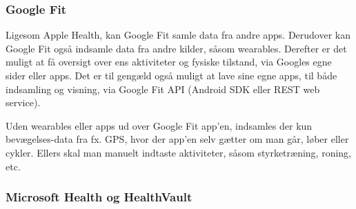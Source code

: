 \subsubsection{Google Fit}
Ligesom Apple Health, kan Google Fit samle data fra andre apps.
Derudover kan Google Fit også indsamle data fra andre kilder, såsom wearables.
Derefter er det muligt at få oversigt over ens aktiviteter og fysiske tilstand, via Googles egne sider eller apps.
Det er til gengæld også muligt at lave sine egne apps, til både indsamling og visning, via Google Fit API (Android SDK eller REST web service).

Uden wearables eller apps ud over Google Fit app'en, indsamles der kun bevægelses-data fra fx. GPS, hvor der app'en selv gætter om man går, løber eller cykler.
Ellers skal man manuelt indtaste aktiviteter, såsom styrketræning, roning, etc.

\subsubsection{Microsoft Health og HealthVault}

